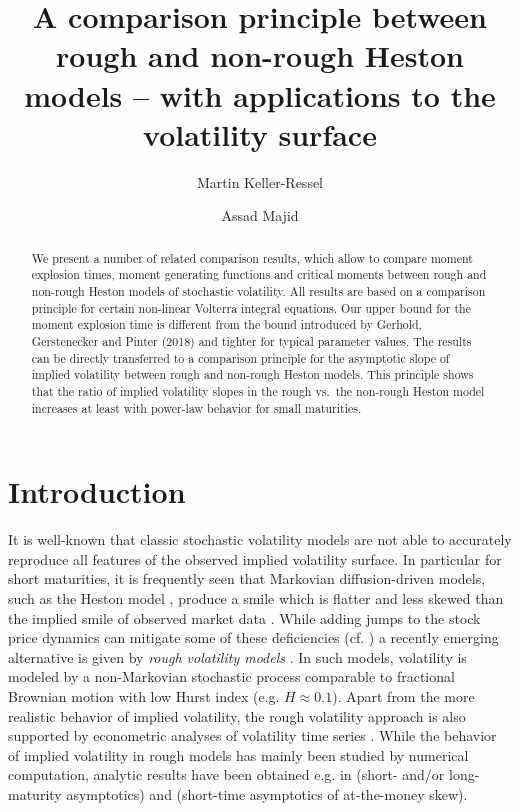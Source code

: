 \documentclass[12pt,a4paper]{amsart}
\numberwithin{equation}{section}
\numberwithin{equation}{section}
\theoremstyle{nonumberplain}
\begin{document}
\title[A comparison principle between rough and non-rough Heston models]{A comparison principle between rough and non-rough Heston models -- with applications to the volatility surface}


\author[M. Keller-Ressel]{Martin Keller-Ressel}
\address{TU Dresden, Institute of Mathematical Stochastics}
\author[A. Majid]{Assad Majid}
\address{TU Dresden, Institute of Mathematical Stochastics}
\begin{abstract}We present a number of related comparison results, which allow to compare moment explosion times, moment generating functions and  critical moments between rough and non-rough Heston models of stochastic volatility. All results are based on a comparison principle for certain non-linear Volterra integral equations. Our upper bound for the moment explosion time is different from the bound introduced by Gerhold, Gerstenecker and Pinter (2018) and tighter for typical parameter values. The results can be directly transferred to a comparison principle for the asymptotic slope of implied volatility between rough and non-rough Heston models. This principle shows that the ratio of implied volatility slopes in the rough vs.\ the non-rough Heston model increases at least with power-law behavior for small maturities. 
\end{abstract}
\maketitle
\section{Introduction} 
It is well-known that classic stochastic volatility models are not able to accurately reproduce all features of the observed implied volatility surface. In particular for short maturities, it is frequently seen that Markovian diffusion-driven models, such as the Heston model \cite{heston1993closed}, produce a smile which is flatter and less skewed  than the implied smile of observed market data \cite{bakshi1997empirical}. While adding jumps to the stock price dynamics can mitigate some of these deficiencies (cf. \cite{bates1996jumps, jacquier2013large}) a recently emerging alternative is given by \textit{rough volatility models} \cite{gatheral2018volatility}. In such models, volatility is modeled by a non-Markovian stochastic process comparable to fractional Brownian motion with low Hurst index (e.g. $H \approx 0.1$). Apart from the more realistic behavior of implied volatility, the rough volatility approach is also supported by econometric analyses of volatility time series \cite{gatheral2018volatility, fukasawa2019volatility}. While the behavior of implied volatility in rough models has mainly been studied by numerical computation, analytic results have been obtained e.g. in \cite{forde2017asymptotics, guennoun2018asymptotic, forde2019small} (short- and/or long-maturity asymptotics) and \cite{fukasawa2017short, bayer2019short} (short-time asymptotics of at-the-money skew).
\end{document}
